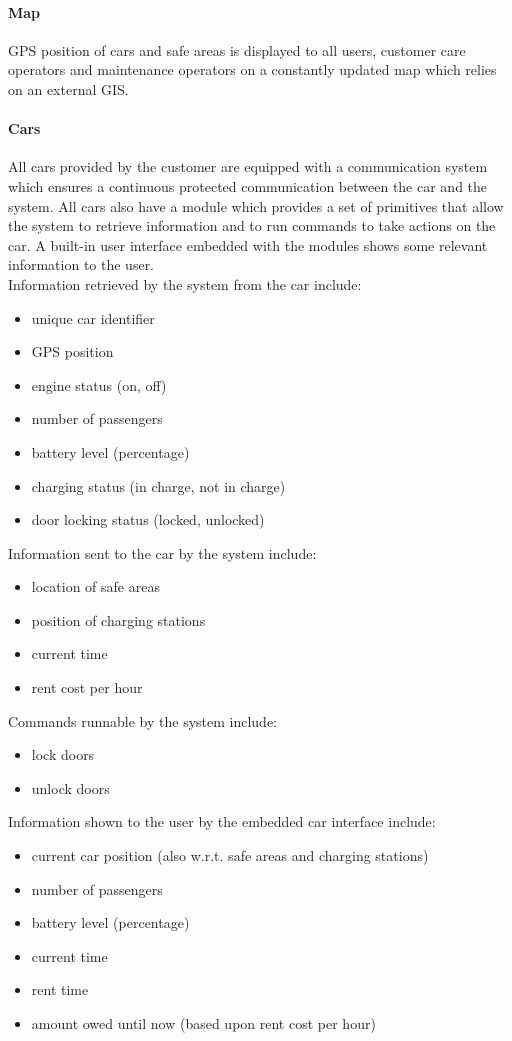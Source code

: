 	\paragraph{Map} GPS position of cars and safe areas is displayed to all users, customer care operators and maintenance operators on a constantly updated map which relies on an external GIS.

	\paragraph{Cars}\label{sec:cars}All cars provided by the customer are equipped with a communication system which ensures a continuous protected communication between the car and the system. All cars also have a module which provides a set of primitives that allow the system to retrieve information and to run commands to take actions on the car. A built-in user interface embedded with the modules shows some relevant information to the user.\\
	Information retrieved by the system from the car include:
	\begin{itemize}
		\item unique car identifier
		\item GPS position
		\item engine status (on, off)
		\item number of passengers
		\item battery level (percentage)
		\item charging status (in charge, not in charge)
		\item door locking status (locked, unlocked)
	\end{itemize}
	Information sent to the car by the system include:
	\begin{itemize}
		\item location of safe areas
		\item position of charging stations
		\item current time
		\item rent cost per hour
	\end{itemize}
	Commands runnable by the system include:
	\begin{itemize}
		\item lock doors
		\item unlock doors
	\end{itemize}		
	Information shown to the user by the embedded car interface include:
	\begin{itemize}
		\item current car position (also w.r.t. safe areas and charging stations)
		\item number of passengers
		\item battery level (percentage)
		\item current time
		\item rent time
		\item amount owed until now (based upon rent cost per hour)
	\end{itemize}
	
